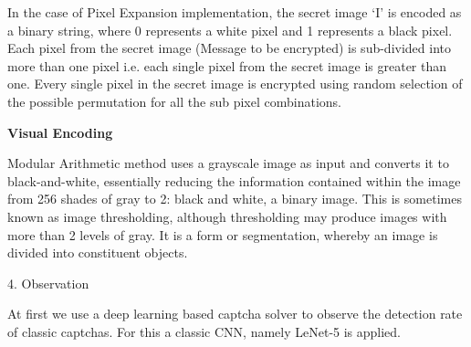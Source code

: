 \documentclass[
    landscape,      %
    paperwidth = 1120mm,
    paperheight = 950mm,
    fontscale = 0.30,
    margin = 1.7cm,
]{baposter}
\begin{document}
\begin{poster}
\begin{posterbox}[column=1]{}
\begin{center}
\end{center}
In the case of Pixel Expansion implementation, the secret image ‘I’ is encoded as a binary string, where 0 represents a white pixel and 1 represents a black pixel. Each pixel from the secret image (Message to be encrypted) is sub-divided into more than one pixel i.e. each single pixel from the secret image is greater than one. Every single pixel in the secret image is encrypted using random selection of the possible permutation for all the sub pixel combinations.


\begin{center}
\textbf{Visual Encoding}
\end{center}

Modular Arithmetic method uses a grayscale image as input and converts it to black-and-white, essentially reducing the information contained within the image from 256 shades of gray to 2: black and white, a binary image. This is sometimes known as image thresholding, although thresholding may produce images with more than 2 levels of gray. It is a form or segmentation, whereby an image is divided into constituent objects.



\end{posterbox}

\begin{posterbox}[column=1, below=auto ]{4. Observation}

At first we use a deep learning based captcha solver to observe the detection rate of classic captchas. For this a classic CNN, namely LeNet-5 is applied.


\end{posterbox}
\end{poster}
\end{document}
